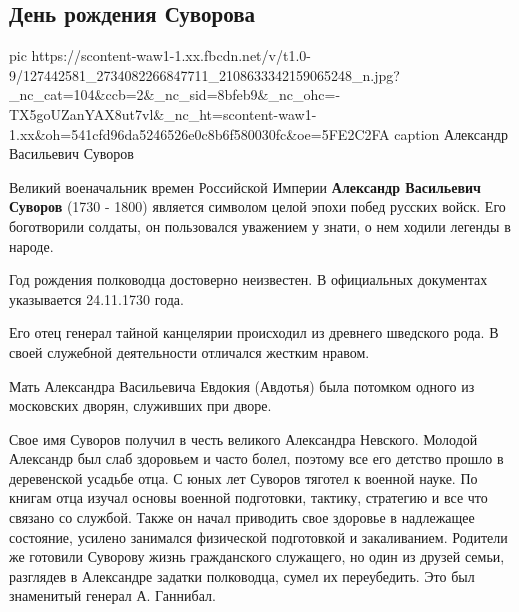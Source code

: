  
 
 
 
 
 
\subsection{День рождения Суворова}
\label{sec:24_11_2020.fb.sinitsa_sergey.1.suvorov}


\ifcmt
pic https://scontent-waw1-1.xx.fbcdn.net/v/t1.0-9/127442581_2734082266847711_2108633342159065248_n.jpg?_nc_cat=104&ccb=2&_nc_sid=8bfeb9&_nc_ohc=-TX5goUZanYAX8ut7vl&_nc_ht=scontent-waw1-1.xx&oh=541cfd96da5246526e0c8b6f580030fc&oe=5FE2C2FA
caption Александр Васильевич Суворов
\fi

Великий военачальник времен Российской Империи \textbf{Александр Васильевич Суворов}
(1730 - 1800) является символом целой эпохи побед русских войск. Его
боготворили солдаты, он пользовался уважением у знати, о нем ходили легенды в
народе.

Год рождения полководца достоверно неизвестен. В официальных документах указывается 24.11.1730 года.

Его отец генерал тайной канцелярии происходил из древнего шведского рода. В своей служебной деятельности отличался жестким нравом.

Мать Александра Васильевича Евдокия (Авдотья) была потомком одного из московских дворян, служивших при дворе.

Свое имя Суворов получил в честь великого Александра Невского. Молодой
Александр был слаб здоровьем и часто болел, поэтому все его детство прошло в
деревенской усадьбе отца. С юных лет Суворов тяготел к военной науке. По книгам
отца изучал основы военной подготовки, тактику, стратегию и все что связано со
службой. Также он начал приводить свое здоровье в надлежащее состояние, усилено
занимался физической подготовкой и закаливанием. Родители же готовили Суворову
жизнь гражданского служащего, но один из друзей семьи, разглядев в Александре
задатки полководца, сумел их переубедить. Это был знаменитый генерал А.
Ганнибал.


